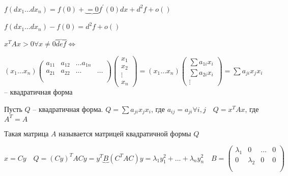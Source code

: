 \documentclass{book}
\newcommand{\p}[1]{#1^{\prime}}
\theoremstyle{definition}
\begin{document}
        $f(dx_1 \ldots dx_{n} ) = f(0) + \underbrace{=0}{\p f(0)dx} + d^2f + o\left(  \right) $ 

        $f(dx_1 \ldots dx_{n} ) - f(0) = d^2f + o\left(  \right) $

        $x^TAx>0 \forall x\neq 0 \overbrace{def}{\iff }$

        $(x_1 \ldots x_{n} )\begin{pmatrix} a_{11} & a_{12} & \ldots a_{1n}\\ a_{21} & a_{22} & \ldots & \ldots\\&&&\\&&& \end{pmatrix} \begin{pmatrix} x_1\\x_2\\ \vdots\\ x_{n}  \end{pmatrix} = \left( x_1 \ldots x_{n}  \right) \begin{pmatrix} \sum a_{1i}x_i\\ \sum a_{2i}x_i\\ \vdots \end{pmatrix} = \sum a_{ji}x_jx_i  $ -- квадратичная форма

        Пусть $Q$ -- квадратичная форма.  $Q = \sum a_{ji}x_jx_i$, где  $a_{ij} = a_{ji} \forall i, j\quad Q = x^TAx$, где $A^T=A$

        Такая матрица $A$ называется  матрицей квадратичной формы $Q$

        $x = Cy\quad Q = \left( Cy \right) ^TACy = y^T\underbrace{B}{\left( C^TAC \right)} y = \lambda_1y_1^2 + \ldots + \lambda_ny_{n} ^2\quad B = \begin{pmatrix} \lambda_1 & 0 & \ldots & 0\\ 0 & \lambda_2 & 0 & 0\\&&&\\&&& \end{pmatrix} $
\end{document}

